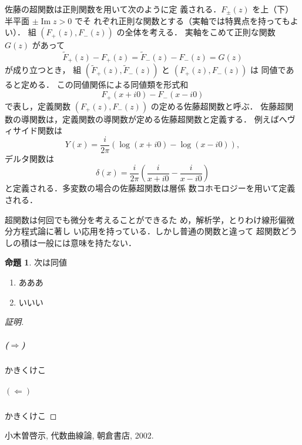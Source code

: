 \documentclass[11pt, a4paper, dvipdfmx]{jsarticle}
\theoremstyle{definition}
\newtheorem{Proposition}[Axiom]{命題}
\newcommand{\im}{\mathop{\mathrm{Im}}\nolimits} %
\theoremstyle{mystyle}
\numberwithin{equation}{section} %
\begin{document}
佐藤の超関数は正則関数を用いて次のように定
義される．$F_\pm(z)$ を上（下）半平面 $\pm\im z>0$ でそ
れぞれ正則な関数とする（実軸では特異点を持ってもよい）．
組 $(F_+(z), F_−(z))$ の全体を考える．
実軸をこめて正則な関数 $G(z)$ があって
\begin{equation*}
    \widetilde{F}_+(z) − F_+(z) = \widetilde{F}_−(z) − F_−(z) = G(z)
\end{equation*}
が成り立つとき，
組 $(\widetilde{F}_+(z), \widetilde{F}_-(z))$ と $(F_+(z),F_−(z))$ は
同値であると定める．
この同値関係による同値類を形式和
\begin{equation*}
    F_+(x + i0) − F_−(x − i0)
\end{equation*}
で表し，定義関数 $(F_+(z), F_−(z))$ の定める佐藤超関数と呼ぶ．
佐藤超関数の導関数は，定義関数の導関数が定める佐藤超関数と定義する．
例えばへヴィサイド関数は
\begin{equation*}
    Y (x) = 
    \frac{i}{2\pi} (\log(x + i0) − \log(x − i0)),
\end{equation*}
デルタ関数は
\begin{equation*}
    \delta(x) = \frac{i}{2\pi}\left(\frac{i}{x + i0}-\frac{i}{x - i0}\right)
\end{equation*}
と定義される．多変数の場合の佐藤超関数は層係
数コホモロジーを用いて定義される．

超関数は何回でも微分を考えることができるた
め，解析学，とりわけ線形偏微分方程式論に著し
い応用を持っている．しかし普通の関数と違って
超関数どうしの積は一般には意味を持たない．

\begin{Proposition}
    次は同値
    \begin{enumerate}
        \item あああ
        \item いいい
    \end{enumerate}
\end{Proposition}
\begin{proof}[証明]
    \subparagraph*{($\Longrightarrow$)}かきくけこ
    \subparagraph*{$(\Longleftarrow)$}かきくけこ
\end{proof}


\begin{thebibliography}{15}

 小木曽啓示, 代数曲線論, 朝倉書店, 2002. 

\end{thebibliography}
\end{document}
